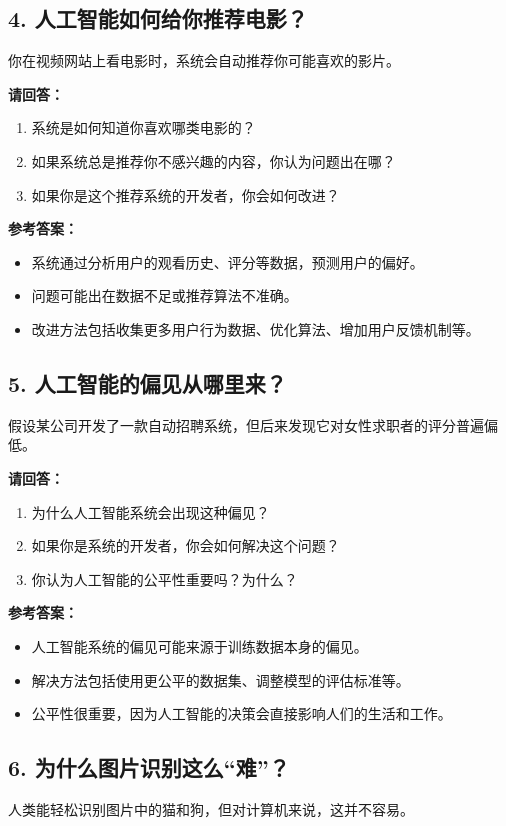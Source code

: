 \subsection*{4. 人工智能如何给你推荐电影？}
你在视频网站上看电影时，系统会自动推荐你可能喜欢的影片。

\textbf{请回答：}
\begin{enumerate}
    \item 系统是如何知道你喜欢哪类电影的？
    \item 如果系统总是推荐你不感兴趣的内容，你认为问题出在哪？
    \item 如果你是这个推荐系统的开发者，你会如何改进？
\end{enumerate}

\textbf{参考答案：}
\begin{itemize}
    \item 系统通过分析用户的观看历史、评分等数据，预测用户的偏好。
    \item 问题可能出在数据不足或推荐算法不准确。
    \item 改进方法包括收集更多用户行为数据、优化算法、增加用户反馈机制等。
\end{itemize}

\subsection*{5. 人工智能的偏见从哪里来？}
假设某公司开发了一款自动招聘系统，但后来发现它对女性求职者的评分普遍偏低。

\textbf{请回答：}
\begin{enumerate}
    \item 为什么人工智能系统会出现这种偏见？
    \item 如果你是系统的开发者，你会如何解决这个问题？
    \item 你认为人工智能的公平性重要吗？为什么？
\end{enumerate}

\textbf{参考答案：}
\begin{itemize}
    \item 人工智能系统的偏见可能来源于训练数据本身的偏见。
    \item 解决方法包括使用更公平的数据集、调整模型的评估标准等。
    \item 公平性很重要，因为人工智能的决策会直接影响人们的生活和工作。
\end{itemize}

\subsection*{6. 为什么图片识别这么“难”？}
人类能轻松识别图片中的猫和狗，但对计算机来说，这并不容易。

